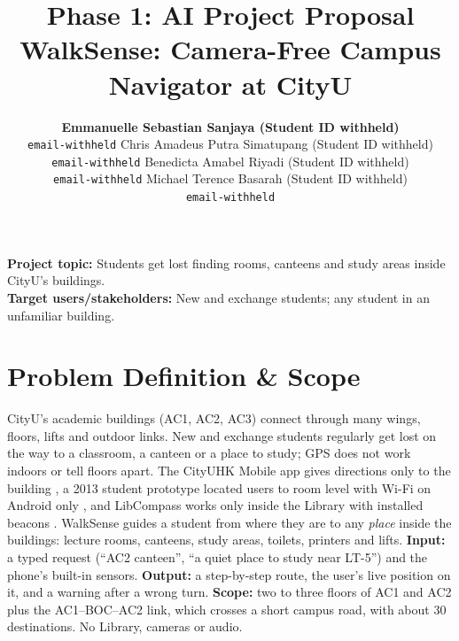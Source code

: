 \documentclass{article}
\title{Phase 1: AI Project Proposal\\
\large WalkSense: Camera-Free Campus Navigator at CityU}
\author{
  \textbf{Emmanuelle Sebastian Sanjaya (Student ID withheld)}\\
  \texttt{email-withheld}
  \And
  Chris Amadeus Putra Simatupang (Student ID withheld)\\
  \texttt{email-withheld}
  \AND
  Benedicta Amabel Riyadi (Student ID withheld)\\
  \texttt{email-withheld}
  \And
  Michael Terence Basarah (Student ID withheld)\\
  \texttt{email-withheld}
}
\begin{document}
\maketitle

\noindent\textbf{Project topic:} Students get lost finding rooms, canteens and study areas inside CityU's buildings.\\
\textbf{Target users/stakeholders:} New and exchange students; any student in an unfamiliar building.


\section{Problem Definition \& Scope}
CityU's academic buildings (AC1, AC2, AC3) connect through many wings, floors, lifts and outdoor links. New and exchange students regularly get lost on the way to a classroom, a canteen or a place to study; GPS does not work indoors or tell floors apart. The CityUHK Mobile app gives directions only to the building \cite{cityumobile}, a 2013 student prototype located users to room level with Wi-Fi on Android only \cite{cityu2013}, and LibCompass works only inside the Library with installed beacons \cite{libcompass}. WalkSense guides a student from where they are to any \emph{place} inside the buildings: lecture rooms, canteens, study areas, toilets, printers and lifts. \textbf{Input:} a typed request (``AC2 canteen'', ``a quiet place to study near LT-5'') and the phone's built-in sensors. \textbf{Output:} a step-by-step route, the user's live position on it, and a warning after a wrong turn. \textbf{Scope:} two to three floors of AC1 and AC2 plus the AC1--BOC--AC2 link, which crosses a short campus road, with about 30 destinations. No Library, cameras or audio.
\end{document}

